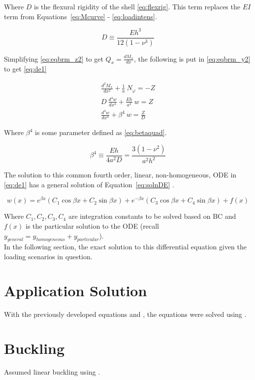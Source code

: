 Where $D$ is the flexural rigidity of the shell \ref{eq:flexrig}. This term replaces the $EI$ term from Equations~\ref{eq:Mcurve} - \ref{eq:loadintens}.

\begin{equation}
	\label{eq:flexrig}
	D \equiv \frac{Eh^3}{12(1-\nu^3)}
\end{equation}

Simplifying \ref{eq:eqbrm_z2} to get $Q_x = \frac{dM_x}{dx}$, the following is put in \ref{eq:eqbrm_y2} to get \ref{eq:de1}

\begin{equation}
	\label{eq:de1}
	\begin{aligned}
		\frac{d^2M_x}{dx^2}+\frac{1}{a} \ N_\varphi = -Z \\
		D\ \frac{d^4w}{dx^4}+\frac{Eh}{a^2} \ w = Z      \\
		\frac{d^4w}{dx^4}+\beta^4 \ w = \frac{Z}{D}      
	\end{aligned}
\end{equation} 

Where $\beta^4$ is some parameter defined as \ref{eq:betaquad}.

\begin{equation}
	\label{eq:betaquad}
	\beta^4 \equiv \frac{Eh}{4a^2D}= \frac{3(1-\nu^2)}{a^2h^2}
\end{equation}

The solution to this common fourth order, linear, non-homogeneous, ODE in \ref{eq:de1} has a general solution of Equation~\ref{eq:solnDE} \cite{timoshenko1959theory}.

\begin{equation}
	\label{eq:solnDE}
	w(x)=e^{\beta x} \left(C_1 \cos \beta x +C_2 \sin \beta x \right)+e^{-\beta x} \left(C_3 \cos \beta x +C_4 \sin \beta x \right) +f(x)
\end{equation}

Where $ C_1, C_2, C_3, C_4$ are integration constants to be solved based on BC and $f(x)$ is the particular solution to the ODE (recall $y_{general}=y_{homogeneous}+y_{particular}$).\\

In the following section, the exact solution to this differential equation given the loading scenarios in question.


\section{Application Solution}

With the previously developed equations and \cite{roarks}, the equations were solved using \cite{EXCEL}.


\section{Buckling}

Assumed linear buckling using \cite{roarks}. 